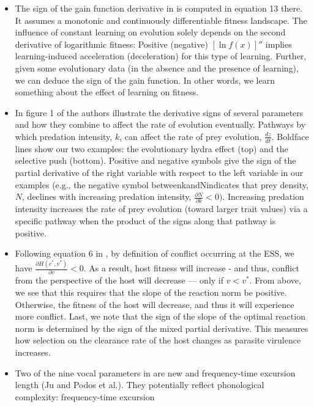 \documentclass[11pt]{book}
\begin{document}
\begin{itemize}
\item The sign of the gain function derivative in \cite{paenke2009influence}
is computed in equation 13 there. It assumes a monotonic and continuously
differentiable fitness landscape. The influence of constant learning
on evolution solely depends on the second derivative of logarithmic
fitness: Positive (negative) $\left[\ln f\left(x\right)\right]''$
implies learning-induced acceleration (deceleration) for this type
of learning. Further, given some evolutionary data (in the absence
and the presence of learning), we can deduce the sign of the gain
function. In other words, we learn something about the effect of learning
on fitness.
\item In figure 1 of \cite{osmond2017predators}
the authors illustrate the derivative signs of several parameters
and how they combine to affect the rate of evolution eventually. Pathways
by which predation intensity, $k$, can affect the rate of prey evolution,
$\frac{dz}{dt}$. Boldface lines show our two examples: the evolutionary
hydra effect (top) and the selective push (bottom). Positive and negative
symbols give the sign of the partial derivative of the right variable
with respect to the left variable in our examples (e.g., the negative
symbol betweenkandNindicates that prey density, $N$, declines with
increasing predation intensity, $\frac{\partial N}{\partial k}<0)$.
Increasing predation intensity increases the rate of prey evolution
(toward larger trait values) via a specific pathway when the product
of the signs along that pathway is positive.
\item Following equation 6 in \cite{day2018role},
by definition of conflict occurring at the ESS, we have $\frac{\partial H\left(c^{*},v^{*}\right)}{\partial v}<0$.
As a result, host fitness will increase - and thus, conflict from
the perspective of the host will decrease --- only if $v<v^{*}$.
From above, we see that this requires that the slope of the reaction
norm be positive. Otherwise, the fitness of the host will decrease,
and thus it will experience more conflict. Last, we note that the
sign of the slope of the optimal reaction norm is determined by the
sign of the mixed partial derivative. This measures how selection
on the clearance rate of the host changes as parasite virulence increases.
\item Two of the nine vocal parameters in \cite{ju2019four}
are new and frequency-time excursion length (Ju and Podos et al.).
They potentially reflect phonological complexity: frequency-time excursion

\end{itemize}
\end{document}
